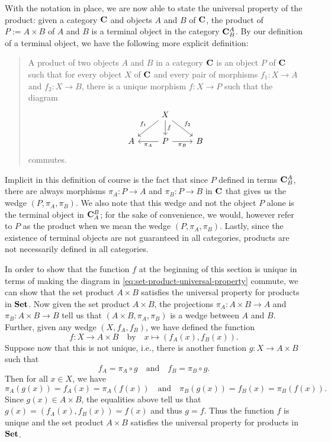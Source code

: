 \begin{example}
    With the notation in place, we are now able to state the universal property
    of the product: given a category \(\mathbf{C}\) and objects \(A\) and \(B\) of
    \(\mathbf{C}\), the product of \(P:= A \times B\) of \(A\) and \(B\) is a
    terminal object in the category \(\mathbf{C}^A_B\). By our definition of a
    terminal object, we have the following more explicit definition:
          \begin{quotation}
            A product of two objects \(A\) and \(B\) in a category \(\mathbf{C}\)
            is an object \(P\) of \(\mathbf{C}\) such that for every object \(X\)
            of \(\mathbf{C}\) and every pair of morphisms \(f_1: X \to A\) and
            \(f_2: X \to B\), there is a unique morphism \(f: X \to P\) such
            that the diagram
            \[
                \begin{tikzcd}
                    & X \arrow[ld, "f_1"'] \arrow[rd, "f_2"] \arrow[d, "f"] &   \\
                  A & P \arrow[r, "\pi_B"'] \arrow[l, "\pi_A"]     & B
                  \end{tikzcd}
            \]
            commutes.
          \end{quotation}
    Implicit in this definition of course is the fact that since \(P\) defined
    in terms \(\mathbf{C}^A_B\), there are always morphisms \(\pi_A: P \to A\) and
    \(\pi_B: P \to B\) in \(\mathbf{C}\) that gives us the wedge \((P, \pi_A,
    \pi_B)\). We also note that this wedge and not the object \(P\) alone is
    the terminal object in \(\mathbf{C}_A^B\); for the sake of convenience, we
    would, however refer to \(P\) as the product when we mean the wedge \((P,
    \pi_A, \pi_B)\). Lastly, since the existence of terminal objects are not
    guaranteed in all categories, products are not necessarily defined in all
    categories.

    In order to show that the function \(f\) at the beginning of this section is
    unique in terms of making the diagram in
    \eqref{eq:set-product-universal-property} commute, we can show that the set
    product \(A \times B\) satisfies the universal property for products in
    \(\mathbf{Set}\). Now given the set product \(A \times B\), the projections \(\pi_A:
    A \times B \to A\) and \(\pi_B: A \times B \to B\) tell us that \((A \times
    B, \pi_A, \pi_B)\) is a wedge between \(A\) and \(B\). Further, given any
    wedge \((X, f_A, f_B)\), we have defined the function
    \[
          f: X \to A \times B \quad \text{by} \quad x \mapsto (f_A(x), f_B(x)).
    \]
    Suppose now that this is not unique, i.e., there is another function \(g: X
    \to A \times B\) such that
    \[
        f_A = \pi_A \circ g \quad \text{and} \quad f_B = \pi_B \circ g.
    \]
    Then for all \(x \in X\), we have
    \[
        \pi_A(g(x)) = f_A(x) = \pi_A(f(x)) \quad \text{and} \quad \pi_B(g(x)) = f_B(x) = \pi_B(f(x)).
    \]
    Since \(g(x) \in A \times B\), the equalities above tell us that \(g(x) =
    (f_A(x), f_B(x)) = f(x)\) and thus \(g = f\). Thus the function \(f\) is
    unique and the set product \(A \times B\) satisfies the universal property
    for products in \(\mathbf{Set}\).


\end{example}

